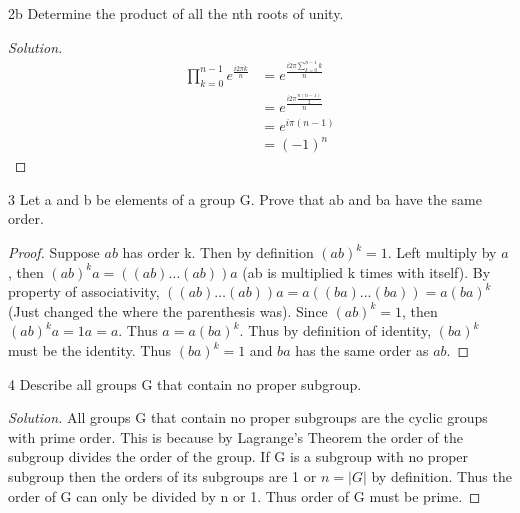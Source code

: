 \documentclass{article}
\newcommand{\abs}[1]{\lvert#1\rvert}
\newenvironment{solution}
{\renewcommand\qedsymbol{$\blacksquare$}\begin{proof}[Solution]}
{\end{proof}}
\begin{document}
\begin{PROB}{2b}\label{Problem 2b.}
    Determine the product of all the nth roots of unity.
\end{PROB}
\begin{solution}
    \begin{align*}{}
        \prod_{k=0}^{n-1}e^{\frac{i2\pi k}{n}} &= e^{\frac{i2\pi \sum_{k=0}^{n-1}k}{n}} \\
        &= e^{\frac{i2\pi \frac{n(n-1)}{2}}{n}} \\
        &= e^{i\pi (n-1)} \\
        &= (-1)^n
    \end{align*}
\end{solution}

\bigskip

\begin{claim}{3}
    Let a and b be elements of a group G. Prove that ab and ba have the same order.
\end{claim}
\begin{proof}

    Suppose $ab$ has order k. Then by definition $(ab)^k = 1$. Left multiply by $a$, then $(ab)^ka = ((ab)\ldots (ab))a$ (ab is multiplied k times with itself). By property of associativity, $((ab)\ldots (ab))a = a((ba)\ldots (ba)) = a(ba)^k$ (Just changed the where the parenthesis was). Since $(ab)^k = 1$, then $(ab)^ka = 1a = a$. Thus $a = a(ba)^k$. Thus by definition of identity, $(ba)^k$ must be the identity. Thus $(ba)^k = 1$ and $ba$ has the same order as $ab$.

\end{proof}

\bigskip

\begin{PROB}{4}\label{Problem 4.}
    Describe all groups G that contain no proper subgroup.
\end{PROB}
\begin{solution}
    All groups G that contain no proper subgroups are the cyclic groups with prime order. This is because by Lagrange's Theorem the order of the subgroup divides the order of the group. If G is a subgroup with no proper subgroup then the orders of its subgroups are 1 or $n = \abs{G}$ by definition. Thus the order of G can only be divided by n or 1. Thus order of G must be prime.
\end{solution}

\bigskip
\end{document}
